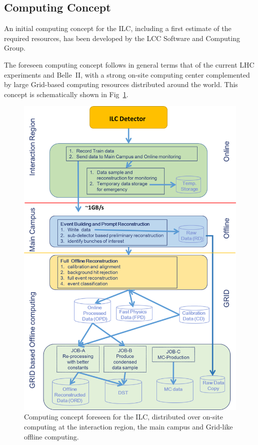 
\subsection{\label{sub:sw-computing}Computing Concept}


An initial computing concept for the ILC, including a first estimate of the required resources, has been developed by the LCC Software and Computing Group.

The foreseen computing concept follows in general terms that of the current LHC experiments and Belle~II, with a strong on-site computing
center complemented by large Grid-based computing resources distributed around the world. This concept is schematically shown in
Fig~\ref{fig:computing_scheme}.

\begin{figure}
\begin{center}
\includegraphics[width=0.6\hsize]{chapters/figures/ILC_computing_scheme.png}
\end{center}
\caption{Computing concept foreseen for the ILC, distributed over on-site computing at the interaction region, the main campus and Grid-like
  offline computing.}
\label{fig:computing_scheme}
\end{figure}

